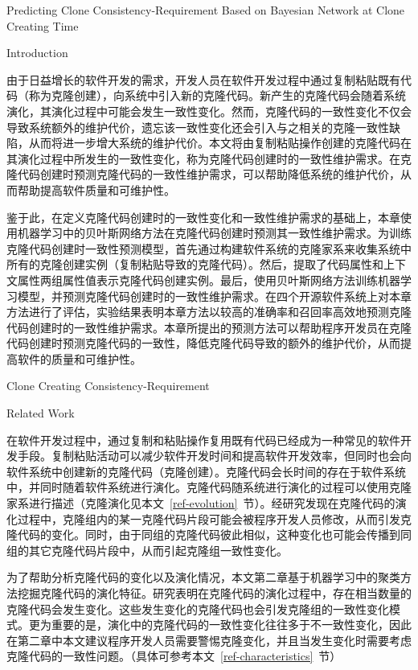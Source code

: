 
{Predicting Clone Consistency-Requirement Based on Bayesian Network at Clone Creating Time}

{Introduction}

由于日益增长的软件开发的需求，开发人员在软件开发过程中通过复制粘贴既有代码（称为克隆创建），向系统中引入新的克隆代码。新产生的克隆代码会随着系统演化，其演化过程中可能会发生一致性变化。然而，克隆代码的一致性变化不仅会导致系统额外的维护代价，遗忘该一致性变化还会引入与之相关的克隆一致性缺陷，从而将进一步增大系统的维护代价。本文将由复制粘贴操作创建的克隆代码在其演化过程中所发生的一致性变化，称为克隆代码创建时的一致性维护需求。在克隆代码创建时预测克隆代码的一致性维护需求，可以帮助降低系统的维护代价，从而帮助提高软件质量和可维护性。

鉴于此，在定义克隆代码创建时的一致性变化和一致性维护需求的基础上，本章使用机器学习中的贝叶斯网络方法在克隆代码创建时预测其一致性维护需求。为训练克隆代码创建时一致性预测模型，首先通过构建软件系统的克隆家系来收集系统中所有的克隆创建实例（复制粘贴导致的克隆代码）。然后，提取了代码属性和上下文属性两组属性值表示克隆代码创建实例。最后，使用贝叶斯网络方法训练机器学习模型，并预测克隆代码创建时的一致性维护需求。在四个开源软件系统上对本章方法进行了评估，实验结果表明本章方法以较高的准确率和召回率高效地预测克隆代码创建时的一致性维护需求。本章所提出的预测方法可以帮助程序开发员在克隆代码创建时预测克隆代码的一致性，降低克隆代码导致的额外的维护代价，从而提高软件的质量和可维护性。

{Clone Creating Consistency-Requirement}

{Related Work}

在软件开发过程中，通过复制和粘贴操作复用既有代码已经成为一种常见的软件开发手段\cite{koschke2007survey}。复制粘贴活动可以减少软件开发时间和提高软件开发效率，但同时也会向软件系统中创建新的克隆代码（克隆创建）。克隆代码会长时间的存在于软件系统中，并同时随着软件系统进行演化。克隆代码随系统进行演化的过程可以使用克隆家系进行描述\cite{kim2005empirical}（克隆演化见本文~\ref{ref-evolution}~节）。经研究发现在克隆代码的演化过程中，克隆组内的某一克隆代码片段可能会被程序开发人员修改，从而引发克隆代码的变化。同时，由于同组的克隆代码彼此相似，这种变化也可能会传播到同组的其它克隆代码片段中，从而引起克隆组一致性变化\cite{saha2011automatic}。

为了帮助分析克隆代码的变化以及演化情况，本文第二章基于机器学习中的聚类方法挖掘克隆代码的演化特征。研究表明在克隆代码的演化过程中，存在相当数量的克隆代码会发生变化。这些发生变化的克隆代码也会引发克隆组的一致性变化模式。更为重要的是，演化中的克隆代码的一致性变化往往多于不一致性变化，因此在第二章中本文建议程序开发人员需要警惕克隆变化，并且当发生变化时需要考虑克隆代码的一致性问题。（具体可参考本文~\ref{ref-characteristics}~节）

